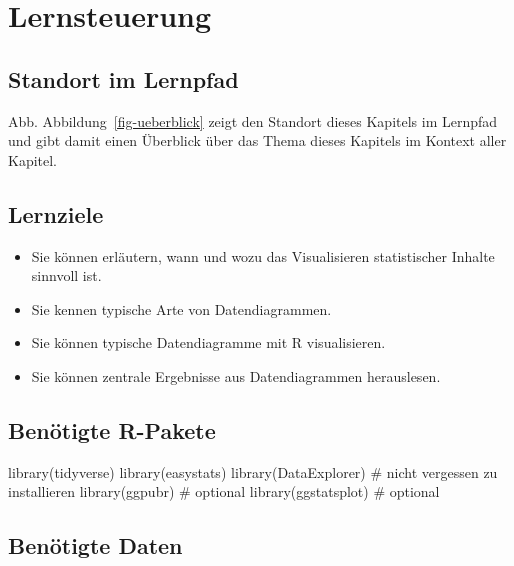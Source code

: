 \documentclass[
  a4paper,
  DIV=11]{scrreprt}
\newenvironment{Shaded}{\begin{snugshade}}{\end{snugshade}}
\newcommand{\CommentTok}[1]{\textcolor[rgb]{0.37,0.37,0.37}{#1}}
\newcommand{\FunctionTok}[1]{\textcolor[rgb]{0.28,0.35,0.67}{#1}}
\newcommand{\NormalTok}[1]{\textcolor[rgb]{0.00,0.23,0.31}{#1}}
\providecommand{\tightlist}{%
  \setlength{\itemsep}{0pt}\setlength{\parskip}{0pt}}\usepackage{longtable,booktabs,array}
\theoremstyle{definition}
\theoremstyle{definition}
\theoremstyle{definition}
\theoremstyle{remark}
\begin{document}
\section{Lernsteuerung}\label{lernsteuerung-3}

\subsection{Standort im Lernpfad}\label{standort-im-lernpfad-3}

Abb. Abbildung~\ref{fig-ueberblick} zeigt den Standort dieses Kapitels
im Lernpfad und gibt damit einen Überblick über das Thema dieses
Kapitels im Kontext aller Kapitel.

\subsection{Lernziele}\label{lernziele-4}

\begin{itemize}
\tightlist
\item
  Sie können erläutern, wann und wozu das Visualisieren statistischer
  Inhalte sinnvoll ist.
\item
  Sie kennen typische Arte von Datendiagrammen.
\item
  Sie können typische Datendiagramme mit R visualisieren.
\item
  Sie können zentrale Ergebnisse aus Datendiagrammen herauslesen.
\end{itemize}

\subsection{Benötigte R-Pakete}\label{benuxf6tigte-r-pakete-2}

\begin{Shaded}
\begin{Highlighting}[]
\FunctionTok{library}\NormalTok{(tidyverse)}
\FunctionTok{library}\NormalTok{(easystats)}
\FunctionTok{library}\NormalTok{(DataExplorer)  }\CommentTok{\# nicht vergessen zu installieren}
\FunctionTok{library}\NormalTok{(ggpubr)  }\CommentTok{\# optional}
\FunctionTok{library}\NormalTok{(ggstatsplot)  }\CommentTok{\# optional}
\end{Highlighting}
\end{Shaded}

\subsection{Benötigte Daten}\label{benuxf6tigte-daten-2}
\end{document}
